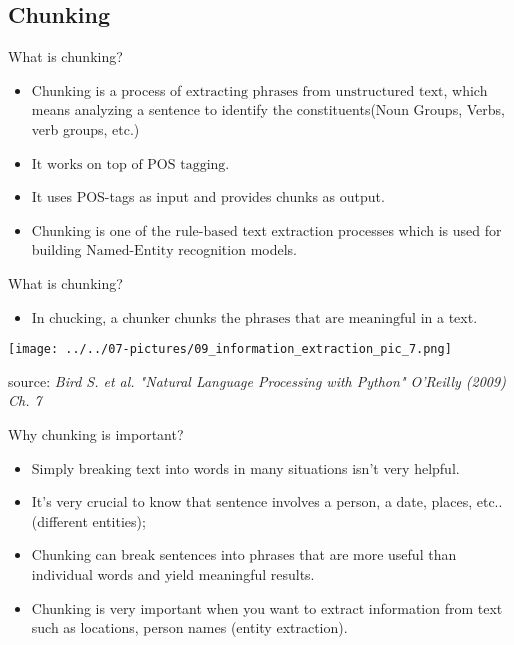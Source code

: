\documentclass[11pt]{beamer}
\newcommand{\highlight}[1]{%
  \colorbox{yellow!100}{$\displaystyle#1$}}
\begin{document}
\subsection{Chunking \\ \scalebox{0.8}{}}
\begin{frame}{What is chunking?}
\begin{itemize}
\item Chunking is a process of \highlight{\text{extracting phrases from unstructured text}}, which means analyzing a sentence to identify the constituents(Noun Groups, Verbs, verb groups, etc.) 
\item \highlight{\text{It works on top of POS tagging}}. 
\item It uses POS-tags as input and provides chunks as output.
\item Chunking is one of the \highlight{\text{rule-based}} text extraction processes which is used for building \highlight{\text{Named-Entity}} recognition models. 
\end{itemize}
\end{frame}
\begin{frame}{What is chunking?}
	\begin{itemize}
		\item In chucking, a chunker chunks the \highlight{\text{phrases that are meaningful}} in a text. 
	\end{itemize}
	\begin{center}
	\texttt{[image: ../../07-pictures/09\_information\_extraction\_pic\_7.png]}
	\end{center}
	\footnotesize{source: \textit{Bird S. et al. "Natural Language Processing with Python" O'Reilly (2009) Ch. 7}}
\end{frame}
\begin{frame}{Why chunking is important?}
\begin{itemize}
\item Simply breaking text into words in many situations isn’t very helpful. \item It’s very crucial to know that sentence involves a person, a date, places, etc.. (different entities);
\item Chunking can break sentences into phrases that are more useful than individual words and yield meaningful results.
\item Chunking is very important when you want to extract information from text such as locations, person names (entity extraction).
\end{itemize}
\end{frame}
\end{document}
